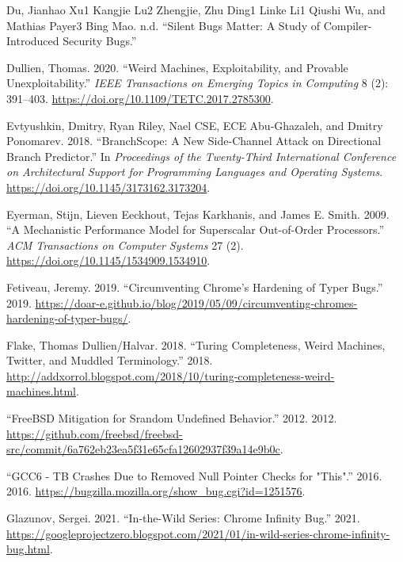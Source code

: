 \documentclass[
  a4paper,
]{report}
\newlength{\cslhangindent}
\newlength{\cslentryspacingunit} %
\newenvironment{CSLReferences}[2] %
 {%
  \setlength{\parindent}{0pt}
  \ifodd #1
  \let\oldpar\par
  \def\par{\hangindent=\cslhangindent\oldpar}
  \fi
  \setlength{\parskip}{#2\cslentryspacingunit}
 }%
 {}
\begin{document}
\begin{CSLReferences}{1}{0}
\leavevmode{}%
Du, Jianhao Xu1 Kangjie Lu2 Zhengjie, Zhu Ding1 Linke Li1 Qiushi Wu, and
Mathias Payer3 Bing Mao. n.d. {``Silent Bugs Matter: A Study of
Compiler-Introduced Security Bugs.''}

\leavevmode{}%
Dullien, Thomas. 2020. {``Weird Machines, Exploitability, and Provable
Unexploitability.''} \emph{IEEE Transactions on Emerging Topics in
Computing} 8 (2): 391--403.
\url{https://doi.org/10.1109/TETC.2017.2785300}.

\leavevmode{}%
Evtyushkin, Dmitry, Ryan Riley, Nael CSE, ECE Abu-Ghazaleh, and Dmitry
Ponomarev. 2018. {``BranchScope: A New Side-Channel Attack on
Directional Branch Predictor.''} In \emph{Proceedings of the
Twenty-Third International Conference on Architectural Support for
Programming Languages and Operating Systems}.
\url{https://doi.org/10.1145/3173162.3173204}.

\leavevmode{}%
Eyerman, Stijn, Lieven Eeckhout, Tejas Karkhanis, and James E. Smith.
2009. {``A Mechanistic Performance Model for Superscalar Out-of-Order
Processors.''} \emph{{ACM} Transactions on Computer Systems} 27 (2).
\url{https://doi.org/10.1145/1534909.1534910}.

\leavevmode{}%
Fetiveau, Jeremy. 2019. {``Circumventing Chrome's Hardening of Typer
Bugs.''} 2019.
\url{https://doar-e.github.io/blog/2019/05/09/circumventing-chromes-hardening-of-typer-bugs/}.

\leavevmode{}%
Flake, Thomas Dullien/Halvar. 2018. {``Turing Completeness, Weird
Machines, Twitter, and Muddled Terminology.''} 2018.
\url{http://addxorrol.blogspot.com/2018/10/turing-completeness-weird-machines.html}.

\leavevmode{}%
{``FreeBSD Mitigation for Srandom Undefined Behavior.''} 2012. 2012.
\url{https://github.com/freebsd/freebsd-src/commit/6a762eb23ea5f31e65cfa12602937f39a14e9b0c}.

\leavevmode{}%
{``GCC6 - TB Crashes Due to Removed Null Pointer Checks for "This".''}
2016. 2016. \url{https://bugzilla.mozilla.org/show_bug.cgi?id=1251576}.

\leavevmode{}%
Glazunov, Sergei. 2021. {``In-the-Wild Series: Chrome Infinity Bug.''}
2021.
\url{https://googleprojectzero.blogspot.com/2021/01/in-wild-series-chrome-infinity-bug.html}.


\end{CSLReferences}
\end{document}

